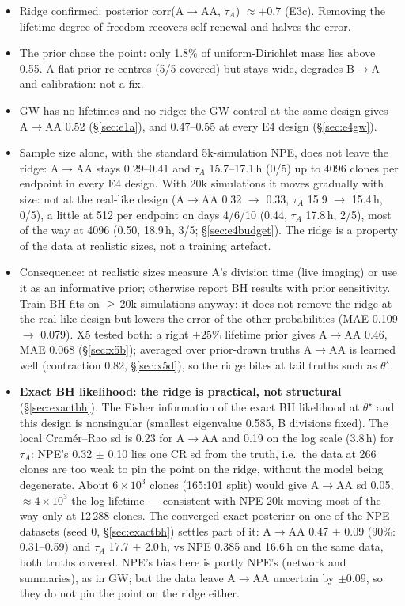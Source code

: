\documentclass[10pt,a4paper]{article}
\newcommand{\tA}{$\tau_A$}
\newcommand{\blk}[1]{\par\needspace{5\baselineskip}\smallskip{\sffamily\bfseries\color{inkgray}#1}\par}
\newcommand{\Comment}{\blk{Comment}}
\renewcommand{\blk}[1]{\par\Needspace*{5\baselineskip}\smallskip{\sffamily\bfseries\color{inkgray}#1}\par}
\newcommand{\sref}[1]{\S\ref{#1}}
\begin{document}
\Comment
\begin{itemize}
\item Ridge confirmed: posterior corr(A$\to$AA, \tA) $\approx +0.7$ (E3c). Removing the lifetime degree of freedom recovers self-renewal and halves the error.
\item The prior chose the point: only 1.8\% of uniform-Dirichlet mass lies above 0.55. A flat prior re-centres (5/5 covered) but stays wide, degrades B$\to$A and calibration: not a fix.
\item GW has no lifetimes and no ridge: the GW control at the same design gives A$\to$AA 0.52 (\S\ref{sec:e1a}), and 0.47--0.55 at every E4 design (\S\ref{sec:e4gw}).
\item Sample size alone, with the standard 5k-simulation NPE, does not leave the ridge: A$\to$AA stays 0.29--0.41 and \tA{} 15.7--17.1\,h (0/5) up to 4096 clones per endpoint in every E4 design. With 20k simulations it moves gradually with size: not at the real-like design (A$\to$AA 0.32 $\to$ 0.33, \tA{} 15.9 $\to$ 15.4\,h, 0/5), a little at 512 per endpoint on days 4/6/10 (0.44, \tA{} 17.8\,h, 2/5), most of the way at 4096 (0.50, 18.9\,h, 3/5; \sref{sec:e4budget}). The ridge is a property of the data at realistic sizes, not a training artefact.
\item Consequence: at realistic sizes measure A's division time (live imaging) or use it as an informative prior; otherwise report BH results with prior sensitivity. Train BH fits on $\ge$\,20k simulations anyway: it does not remove the ridge at the real-like design but lowers the error of the other probabilities (MAE 0.109 $\to$ 0.079). X5 tested both: a right $\pm 25\%$ lifetime prior gives A$\to$AA 0.46, MAE 0.068 (\S\ref{sec:x5b}); averaged over prior-drawn truths A$\to$AA is learned well (contraction 0.82, \S\ref{sec:x5d}), so the ridge bites at tail truths such as $\theta^\star$.
\item \textbf{Exact BH likelihood: the ridge is practical, not structural} (\S\ref{sec:exactbh}). The Fisher information of the exact BH likelihood at $\theta^\star$ and this design is nonsingular (smallest eigenvalue 0.585, B divisions fixed). The local Cram\'er--Rao sd is 0.23 for A$\to$AA and 0.19 on the log scale (3.8\,h) for \tA: NPE's 0.32 $\pm$ 0.10 lies one CR sd from the truth, i.e.\ the data at 266 clones are too weak to pin the point on the ridge, without the model being degenerate. About $6\times10^3$ clones (165:101 split) would give A$\to$AA sd 0.05, $\approx 4\times10^3$ the log-lifetime --- consistent with NPE 20k moving most of the way only at 12\,288 clones. The converged exact posterior on one of the NPE datasets (seed 0, \S\ref{sec:exactbh}) settles part of it: A$\to$AA 0.47 $\pm$ 0.09 (90\%: 0.31--0.59) and \tA{} 17.7 $\pm$ 2.0\,h, vs NPE 0.385 and 16.6\,h on the same data, both truths covered. NPE's bias here is partly NPE's (network and summaries), as in GW; but the data leave A$\to$AA uncertain by $\pm 0.09$, so they do not pin the point on the ridge either.
\end{itemize}
\end{document}

